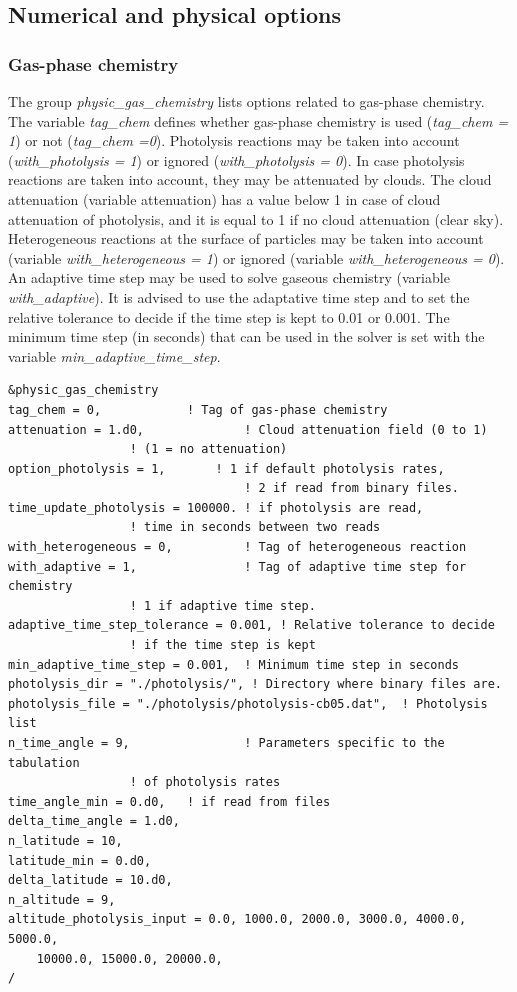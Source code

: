 \documentclass[a4paper,11pt]{article}
\begin{document}
\subsection{Numerical and physical options}

\subsubsection{Gas-phase chemistry}

The group {\textit{physic\_gas\_chemistry}} lists options related to gas-phase chemistry. 
The variable {\textit{tag\_chem}} defines whether gas-phase chemistry is used ({\textit{tag\_chem = 1}}) or not ({\textit{tag\_chem =0}}). 
Photolysis reactions may be taken into account ({\textit{with\_photolysis = 1}}) or ignored ({\textit{with\_photolysis = 0}}). In case photolysis reactions are taken into account, they may be attenuated by clouds. The cloud attenuation (variable attenuation) has a value below 1 in case of cloud attenuation of photolysis, and it is equal to 1 if no cloud attenuation (clear sky).
Heterogeneous reactions at the surface of particles may be taken into account (variable {\textit{with\_heterogeneous = 1}}) or ignored (variable {\textit{with\_heterogeneous = 0}}). An adaptive time step may be used to solve gaseous chemistry (variable {\textit{with\_adaptive}}). It is advised to use the adaptative time step and to set the relative tolerance to decide if the time step is kept to 0.01 or 0.001. The minimum time step (in seconds) that can be used in the solver is set with the variable {\textit{min\_adaptive\_time\_step}}.


\begin{verbatim}
&physic_gas_chemistry
tag_chem = 0,		   	 ! Tag of gas-phase chemistry
attenuation = 1.d0,              ! Cloud attenuation field (0 to 1)
				 ! (1 = no attenuation)
option_photolysis = 1,	 	 ! 1 if default photolysis rates, 
                                 ! 2 if read from binary files.
time_update_photolysis = 100000. ! if photolysis are read, 
				 ! time in seconds between two reads
with_heterogeneous = 0,          ! Tag of heterogeneous reaction 
with_adaptive = 1,               ! Tag of adaptive time step for chemistry 
				 ! 1 if adaptive time step.
adaptive_time_step_tolerance = 0.001, ! Relative tolerance to decide 
			 	 ! if the time step is kept
min_adaptive_time_step = 0.001,  ! Minimum time step in seconds
photolysis_dir = "./photolysis/", ! Directory where binary files are.
photolysis_file = "./photolysis/photolysis-cb05.dat",  ! Photolysis list
n_time_angle = 9,                ! Parameters specific to the tabulation 
			 	 ! of photolysis rates
time_angle_min = 0.d0,   ! if read from files
delta_time_angle = 1.d0,
n_latitude = 10,
latitude_min = 0.d0,
delta_latitude = 10.d0,
n_altitude = 9,
altitude_photolysis_input = 0.0, 1000.0, 2000.0, 3000.0, 4000.0, 5000.0, 
	10000.0, 15000.0, 20000.0, 
/
\end{verbatim}
\end{document}
